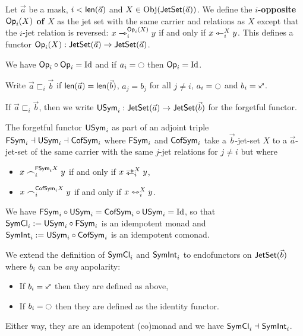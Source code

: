 \documentclass[a4paper]{memoir}
\begin{document}
\begin{definition} \label{def:op}
	Let $\vec a$ be a mask, $i < \mathsf{len}(\vec a)$ and $X \in \mathrm{Obj}(\mathsf{JetSet}(\vec a))$.
	We define the \textbf{$i$-opposite ${\mathsf{Op}}_i(X)$ of $X$} as the jet set with the same carrier and relations as $X$ except that the $i$-jet relation is reversed: $x \rightarrowtriangle_i^{{\mathsf{Op}}_i(X)} y$ if and only if $x \leftarrowtriangle_i^X y$.
	This defines a functor ${\mathsf{Op}}_i(X) : \mathsf{JetSet}(\vec a) \to \mathsf{JetSet}(\vec a)$.
\end{definition}
We have ${\mathsf{Op}}_i \circ {\mathsf{Op}}_i = \mathrm{Id}$ and if $a_i = \npolar$ then ${\mathsf{Op}}_i = \mathrm{Id}$.
\begin{definition} \label{def:sym-forget}
	Write $\vec a \sqsubset_i \vec b$ if $\mathsf{len}(\vec a) = \mathsf{len}(\vec b)$, $a_j = b_j$ for all $j \neq i$, $a_i = \npolar$ and $b_i = \ypolar$.
	
	If $\vec a \sqsubset_i \vec b$, then we write $\mathsf{USym}_i : \mathsf{JetSet}(\vec a) \to \mathsf{JetSet}(\vec b)$ for the forgetful functor.
\end{definition}
\begin{corollary} \label{def:sym-free} \label{def:sym-cofree}
	The forgetful functor $\mathsf{USym}_i$ as part of an adjoint triple $\mathsf{FSym}_i \dashv \mathsf{USym}_i \dashv \mathsf{CofSym}_i$ where $\mathsf{FSym}_i$ and $\mathsf{CofSym}_i$ take a $\vec b$-jet-set $X$ to a $\vec a$-jet-set of the same carrier with the same $j$-jet relations for $j \neq i$ but where
	\begin{itemize}
		\item $x \frown_i^{\mathsf{FSym}_i X} y$ if and only if $x \infrajet_i^X y$,
		\item $x \frown_i^{\mathsf{CofSym}_i X} y$ if and only if $x \leftrightarrowtriangle_i^X y$.
	\end{itemize}
	We have $\mathsf{FSym}_i \circ \mathsf{USym}_i = \mathsf{CofSym}_i \circ \mathsf{USym}_i = \mathrm{Id}$, so that $\mathsf{SymCl}_i := \mathsf{USym}_i \circ \mathsf{FSym}_i$ is an idempotent monad and $\mathsf{SymInt}_i := \mathsf{USym}_i \circ \mathsf{CofSym}_i$ is an idempotent comonad.
\end{corollary}
\begin{definition} \label{def:sym-closure-of-sym}
	We extend the definition of $\mathsf{SymCl}_i$ and $\mathsf{SymInt}_i$ to endofunctors on $\mathsf{JetSet}(\vec b)$ where $b_i$ can be \emph{any} anpolarity:
	\begin{itemize}
		\item If $b_i = \ypolar$ then they are defined as above,
		\item If $b_i = \npolar$ then they are defined as the identity functor.
	\end{itemize}
	Either way, they are an idempotent (co)monad and we have $\mathsf{SymCl}_i \dashv \mathsf{SymInt}_i$.
\end{definition}
\end{document}
